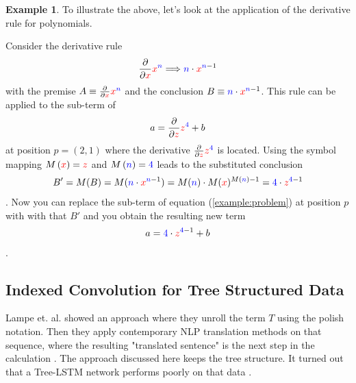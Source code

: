 \documentclass{scrartcl}
\theoremstyle{definition}
\newtheorem{exmp}{Example}[section]
\begin{document}
\begin{exmp}
To illustrate the above, let's look at the application of the derivative rule for polynomials.

Consider the derivative rule
\begin{align}
	\frac{\partial}{\partial {\color{red}x}} {\color{red}x}^{\color{blue}n} \Longrightarrow {\color{blue}n}\cdot {\color{red}x}^{{\color{blue}n}-1} 
\end{align}
with the premise $A\equiv \frac{\partial}{\partial {\color{red}x}} {\color{red}x}^{\color{blue}n}$ and the conclusion $B\equiv {\color{blue}n}\cdot {\color{red}x}^{{\color{blue}n}-1}$.
This rule can be applied to the sub-term of
\begin{align}
	a = \frac{\partial}{\partial {\color{red}z}} {\color{red}z}^{\color{blue}4} + b
	\label{example:problem}
\end{align}
at position $p=\left(2,1\right)$ where the derivative $\frac{\partial}{\partial {\color{red}z}} {\color{red}z}^{\color{blue}4}$ is located.
Using the symbol mapping $M\left({\color{red}x}\right) = \color{red}z$ and $M\left({\color{blue}n} \right) = {\color{blue}4}$ leads to the substituted conclusion
\begin{align}
B' = M(B) = M({\color{blue}n}\cdot {\color{red}x}^{{\color{blue}n}-1}) = {M(\color{blue}n})\cdot M({\color{red}x})^{M({\color{blue}n})-1} = {\color{blue}4}\cdot {\color{red}z}^{{\color{blue}4}-1}
\end{align}.
Now you can replace the sub-term of equation (\ref{example:problem}) at position $p$ with with that $B'$ and you obtain the resulting new term
\begin{align}
	a = {\color{blue}4}\cdot {\color{red}z}^{{\color{blue}4}-1} + b
\end{align}.

\end{exmp}

\subsection{Indexed Convolution for Tree Structured Data}

Lampe et. al. showed an approach where they unroll the term $T$ using the polish notation.
Then they apply contemporary NLP translation methods on that sequence, where the resulting "translated sentence" is the next step in the calculation \cite{Lample2020Deep}.
The approach discussed here keeps the tree structure.
It turned out that a Tree-LSTM network performs poorly on that data \cite{tai2015improved}.
\end{document}
